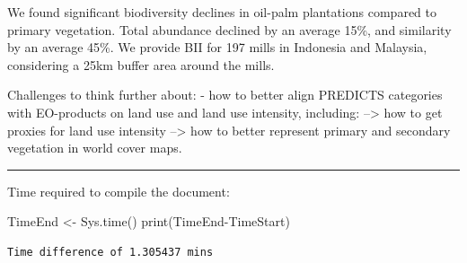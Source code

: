 \documentclass[
  letterpaper,
  DIV=11,
  numbers=noendperiod]{scrartcl}
\newenvironment{Shaded}{\begin{snugshade}}{\end{snugshade}}
\newcommand{\FunctionTok}[1]{\textcolor[rgb]{0.28,0.35,0.67}{#1}}
\newcommand{\NormalTok}[1]{\textcolor[rgb]{0.00,0.23,0.31}{#1}}
\newcommand{\OtherTok}[1]{\textcolor[rgb]{0.00,0.23,0.31}{#1}}
\newcommand{\SpecialCharTok}[1]{\textcolor[rgb]{0.37,0.37,0.37}{#1}}
\begin{document}
We found significant biodiversity declines in oil-palm plantations
compared to primary vegetation. Total abundance declined by an average
15\%, and similarity by an average 45\%. We provide BII for 197 mills in
Indonesia and Malaysia, considering a 25km buffer area around the mills.

Challenges to think further about: - how to better align PREDICTS
categories with EO-products on land use and land use intensity,
including: --\textgreater{} how to get proxies for land use intensity
--\textgreater{} how to better represent primary and secondary
vegetation in world cover maps.

\begin{center}\rule{0.5\linewidth}{0.5pt}\end{center}

Time required to compile the document:

\begin{Shaded}
\begin{Highlighting}[]
\NormalTok{TimeEnd }\OtherTok{\textless{}{-}} \FunctionTok{Sys.time}\NormalTok{()}
\FunctionTok{print}\NormalTok{(TimeEnd}\SpecialCharTok{{-}}\NormalTok{TimeStart)}
\end{Highlighting}
\end{Shaded}

\begin{verbatim}
Time difference of 1.305437 mins
\end{verbatim}
\end{document}
